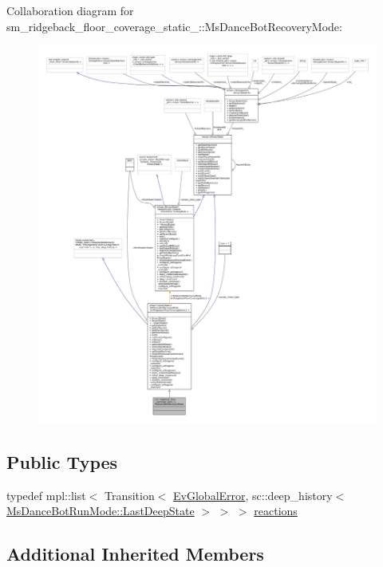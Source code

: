 Collaboration diagram for sm\+\_\+ridgeback\+\_\+floor\+\_\+coverage\+\_\+static\+\_\+:\+:Ms\+Dance\+Bot\+Recovery\+Mode\+:
\nopagebreak
\begin{figure}[H]
\begin{center}
\leavevmode
\includegraphics[width=350pt]{classsm__ridgeback__floor__coverage__static__1_1_1MsDanceBotRecoveryMode__coll__graph}
\end{center}
\end{figure}
\subsection*{Public Types}
\begin{DoxyCompactItemize}
\item 
typedef mpl\+::list$<$ Transition$<$ \hyperlink{structsm__ridgeback__floor__coverage__static__1_1_1EvGlobalError}{Ev\+Global\+Error}, sc\+::deep\+\_\+history$<$ \hyperlink{classsmacc_1_1SmaccState_a60088405d2d99d468caa0baa3b2830a8}{Ms\+Dance\+Bot\+Run\+Mode\+::\+Last\+Deep\+State} $>$ $>$ $>$ \hyperlink{classsm__ridgeback__floor__coverage__static__1_1_1MsDanceBotRecoveryMode_a57e74d1d06f5511f25a1372ce940efc1}{reactions}
\end{DoxyCompactItemize}
\subsection*{Additional Inherited Members}


